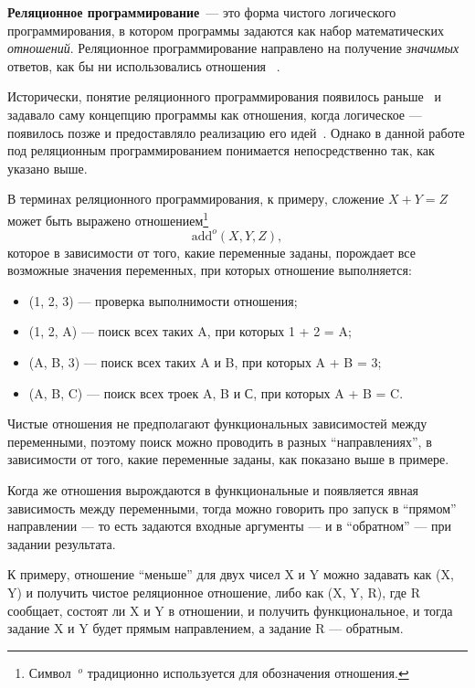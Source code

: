 {\bf Реляционное программирование}~--- это форма чистого логического
программирования, в котором программы задаются как набор
математических {\it отношений}. Реляционное программирование направлено
на получение \emph{значимых} ответов, как бы ни использовались отношения
~\cite{byrdMK}.

Исторически, понятие реляционного программирования появилось
раньше~\cite{relML} и задавало саму концепцию программы как отношения,
когда логическое --- появилось позже и предоставляло реализацию его
идей~\cite{logicMJ}.
Однако в данной работе под реляционным программированием понимается
непосредственно так, как указано выше.

В терминах реляционного программирования, к примеру, сложение $X + Y = Z$
может быть выражено отношением\footnote{Символ $\ ^o$ традиционно
используется для обозначения отношения.}
\[\text{add}^o (X, Y, Z),\]
которое в зависимости от того, какие переменные заданы, порождает
все возможные значения переменных, при которых отношение выполняется:
\begin{itemize}
\item {}(1, 2, 3) --- проверка выполнимости отношения;
\item {}(1, 2, A) --- поиск всех таких A, при которых 1 + 2 = A;
\item {}(A, B, 3) --- поиск всех таких A и B, при которых A + B = 3;
\item {}(A, B, C) --- поиск всех троек A, B и С, при которых A + B = C.
\end{itemize}

Чистые отношения не предполагают функциональных зависимостей между переменными,
поэтому поиск можно проводить в разных ``направлениях'', в зависимости от
того, какие переменные заданы, как показано выше в примере.

Когда же отношения вырождаются в функциональные и появляется
явная зависимость между переменными, тогда можно говорить про запуск
в ``прямом'' направлении --- то есть задаются входные аргументы --- и в
``обратном'' --- при задании результата.

К примеру, отношение ``меньше'' для двух чисел X и Y можно задавать как
(X, Y) и получить чистое реляционное отношение, либо
как (X, Y, R), где R сообщает, состоят ли X и Y
в отношении, и получить функциональное, и тогда задание X и Y будет
прямым направлением, а задание R --- обратным.


